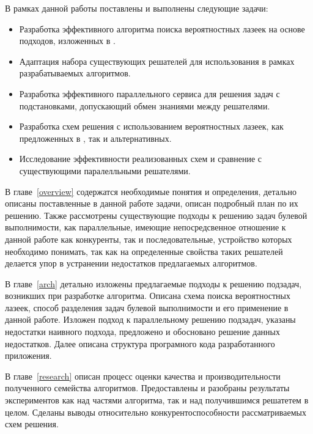 В рамках данной работы поставлены и выполнены следующие задачи:
\begin{itemize}
    \item Разработка эффективного алгоритма поиска вероятностных лазеек на основе подходов,
        изложенных в .
    \item Адаптация набора существующих решателей для использования в рамках разрабатываемых
        алгоритмов.
    \item Разработка эффективного параллельного сервиса для решения задач с подстановками,
        допускающий обмен знаниями между решателями.
    \item Разработка схем решения с использованием вероятностных лазеек, как предложенных в ,
        так и альтернативных.
    \item Исследование эффективности реализованных схем и сравнение с существующими
        паралелльными решателями.
\end{itemize}

В главе~\ref{overview} содержатся необходимые понятия и определения, детально описаны поставленные
в данной работе задачи, описан подробный план по их решению. Также рассмотрены существующие
подходы к решению задач булевой выполнимости, как параллельные, имеющие непосредсвенное отношение
к данной работе как конкуренты, так и последовательные, устройство которых необходимо понимать,
так как на определенные свойства таких решателей делается упор в устранении недостатков
предлагаемых алгоритмов.

В главе~\ref{arch} детально изложены предлагаемые подходы к решению подзадач, возникших при
разработке алгоритма. Описана схема поиска вероятностных лазеек, способ разделения задач булевой
выполнимости и его применение в данной работе. Изложен подход к параллельному решению подзадач,
указаны недостатки наивного подхода, предложено и обосновано решение данных недостатков. Далее
описана структура програмного кода разработанного приложения.

В главе~\ref{research} описан процесс оценки качества и производительности полученного семейства
алгоритмов. Предоставлены и разобраны результаты экспериментов как над частями алгоритма, так и
над получившимся решатетем в целом. Сделаны выводы относительно конкурентоспособности рассматриваемых
схем решения.

